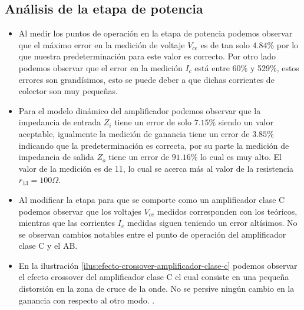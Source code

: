 \subsection{Análisis de la etapa de potencia}


\begin{itemize}
    \item Al medir los puntos de operación en la etapa de potencia podemos observar que el máximo error en la medición de voltaje $V_{ce}$ es de tan solo $4.84\%$ por lo que nuestra predeterminación para este valor es correcto. Por otro lado podemos observar que el error en la medición $I_c$ está entre 60\% y 529\%, estos errores son grandísimos, esto se puede deber a que dichas corrientes de colector son muy pequeñas.
    \item Para el modelo dinámico del amplificador podemos observar que la impedancia de entrada $Z_i$ tiene un error de solo $7.15\%$ siendo un valor aceptable, igualmente la medición de ganancia tiene un error de $3.85\%$ indicando que la predeterminación es correcta, por su parte la medición de impedancia de salida $Z_o$ tiene un error de $91.16\%$ lo cual es muy alto. El valor de la medición es de 11, lo cual se acerca más al valor de la resistencia $r_{13} = 100\Omega$.
    \item Al modificar la etapa para que se comporte como un amplificador clase C podemos observar que los voltajes $V_{ce}$ medidos corresponden con los teóricos, mientras que las corrientes $I_e$ medidas siguen teniendo un error altísimos. No se observan cambios notables entre el punto de operación del amplificador clase C y el AB. 
    \item En la ilustración \ref{ilus:efecto-crossover-amplificador-clase-c} podemos observar el efecto crossover del amplificador clase C el cual consiste en una pequeña distorsión en la zona de cruce de la onde. No se persive ningún cambio en la ganancia con respecto al otro modo. .
\end{itemize}